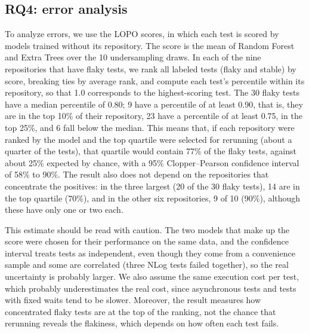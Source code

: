 \subsection{RQ4: error analysis}
\label{sec:rq4}
To analyze errors, we use the LOPO scores, in which each test is scored by models trained without its repository. The score is the mean of Random Forest and Extra Trees over the 10 undersampling draws. In each of the nine repositories that have flaky tests, we rank all labeled tests (flaky and stable) by score, breaking ties by average rank, and compute each test's percentile within its repository, so that 1.0 corresponds to the highest-scoring test. The 30 flaky tests have a median percentile of 0.80; 9 have a percentile of at least 0.90, that is, they are in the top 10\% of their repository, 23 have a percentile of at least 0.75, in the top 25\%, and 6 fall below the median. This means that, if each repository were ranked by the model and the top quartile were selected for rerunning (about a quarter of the tests), that quartile would contain 77\% of the flaky tests, against about 25\% expected by chance, with a 95\% Clopper--Pearson confidence interval of 58\% to 90\%.  The result also does not depend on the repositories that concentrate the positives: in the three largest (20 of the 30 flaky tests), 14 are in the top quartile (70\%), and in the other six repositories, 9 of 10 (90\%), although these have only one or two each.

This estimate should be read with caution. The two models that make up the score were chosen for their performance on the same data, and the confidence interval treats tests as independent, even though they come from a convenience sample and some are correlated (three NLog tests failed together), so the real uncertainty is probably larger. We also assume the same execution cost per test, which probably underestimates the real cost, since asynchronous tests and tests with fixed waits tend to be slower. Moreover, the result measures how concentrated flaky tests are at the top of the ranking, not the chance that rerunning reveals the flakiness, which depends on how often each test fails.

